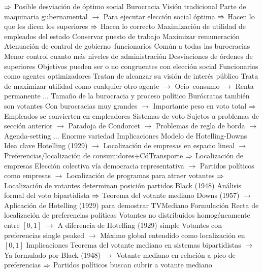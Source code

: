 \documentclass{nuevotema}
\begin{document}
\begin{esquemal}
				\4[] $\then$ Posible desviación de óptimo social
			\3 Burocracia
				\4 Visión tradicional
				\4[] Parte de maquinaria gubernamental
				\4[] $\to$ Para ejecutar elección social óptima
				\4[] $\then$ Hacen lo que les dicen los superiores
				\4[] $\then$ Hacen lo correcto
				\4 Maximización de utilidad de empleados del estado
				\4[] Conservar puesto de trabajo
				\4[] Maximizar remuneración
				\4 Atenuación de control de gobierno--funcionarios
				\4[] Común a todas las burocracias
				\4[] Menor control cuanto más niveles de administración
				\4[$\then$] Desviaciones de órdenes de superiores
				\4[$\then$] Objetivos pueden ser o no congruentes con elección social
				\4 Funcionarios como agentes optimizadores
				\4[] Tratan de alcanzar su visión de interés público
				\4[] Trata de maximizar utilidad como cualquier otro agente
				\4[] $\to$ Ocio--consumo
				\4[] $\to$ Renta permanente
				\4[] ...
				\4 Tamaño de la burocracia y proceso político
				\4[] Burócratas también son votantes
				\4[] Con burocracias muy grandes
				\4[] $\to$ Importante peso en voto total
				\4[] $\then$ Empleados se convierten en empleadores
			\3 Sistemas de voto
				\4 Sujetos a problemas de sección anterior
				\4[] $\to$ Paradoja de Condorcet
				\4[] $\to$ Problemas de regla de borda
				\4[] $\to$ Agenda-setting
				\4[] ...
				\4 Enorme variedad
		\2 Implicaciones
			\3 Modelo de Hotelling-Downs
				\4 Idea clave
				\4[] Hotelling (1929)
				\4[] $\to$ Localización de empresas en espacio lineal
				\4[] $\to$ Preferencias/localización de consumidores+CdTransporte
				\4[] $\then$ Localización de empresas
				\4[] Elección colectiva vía democracia representativa
				\4[] $\to$ Partidos políticos como empresas
				\4[] $\to$ Localización de programas para atraer votantes
				\4[] $\then$ Localización de votantes determinan posición partidos
				\4[] Black (1948)
				\4[] Análisis formal del voto bipartidista
				\4[] $\then$ Teorema del votante mediano
				\4[] Downs (1957)
				\4[] $\to$ Aplicación de Hotelling (1929) para demostrar TVMediano
				\4 Formulación
				\4[] Recta de localización de preferencias políticas
				\4[] Votantes no distribuidos homogéneamente entre $[0,1]$
				\4[] $\to$ A diferencia de Hotelling (1929) simple
				\4[] Votantes con preferencias single peaked
				\4[] $\to$ Máximo global entendido como localización en $[0,1]$
				\4 Implicaciones
				\4[] Teorema del votante mediano en sistemas bipartidistas
				\4[] $\to$ Ya formulado por Black (1948)
				\4[] $\to$ Votante mediano en relación a pico de preferencias
				\4[] $\then$ Partidos políticos buscan cubrir a votante mediano

\end{esquemal}
\end{document}

